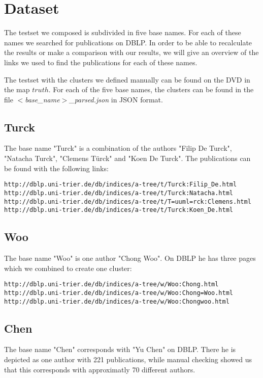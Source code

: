 \chapter{Dataset}
\label{appendix:dataset}
The testset we composed is subdivided in five base names. For each of these names we searched for publications on DBLP. In order to be able to recalculate the results or make a comparison with our results, we will give an overview of the links we used to find the publications for each of these names.

The testset with the clusters we defined manually can be found on the DVD in the map $truth$. For each of the five base names, the clusters can be found in the file \textit{$<$base\_name$>$\_parsed.json} in JSON format.

\section*{Turck}

The base name "Turck" is a combination of the authors "Filip De Turck", "Natacha Turck", "Clemens T\"urck" and "Koen De Turck". The publications can be found with the following links:

\begin{verbatim}
http://dblp.uni-trier.de/db/indices/a-tree/t/Turck:Filip_De.html
http://dblp.uni-trier.de/db/indices/a-tree/t/Turck:Natacha.html
http://dblp.uni-trier.de/db/indices/a-tree/t/T=uuml=rck:Clemens.html
http://dblp.uni-trier.de/db/indices/a-tree/t/Turck:Koen_De.html
\end{verbatim}

\section*{Woo}

The base name "Woo" is one author "Chong Woo". On DBLP he has three pages which we combined to create one cluster:

\begin{verbatim}
http://dblp.uni-trier.de/db/indices/a-tree/w/Woo:Chong.html
http://dblp.uni-trier.de/db/indices/a-tree/w/Woo:Chong=Woo.html
http://dblp.uni-trier.de/db/indices/a-tree/w/Woo:Chongwoo.html
\end{verbatim}

\section*{Chen}

The base name "Chen" corresponds with "Yu Chen" on DBLP. There he is depicted as one author with 221 publications, while manual checking showed us that this corresponds with approximatly 70 different authors.

